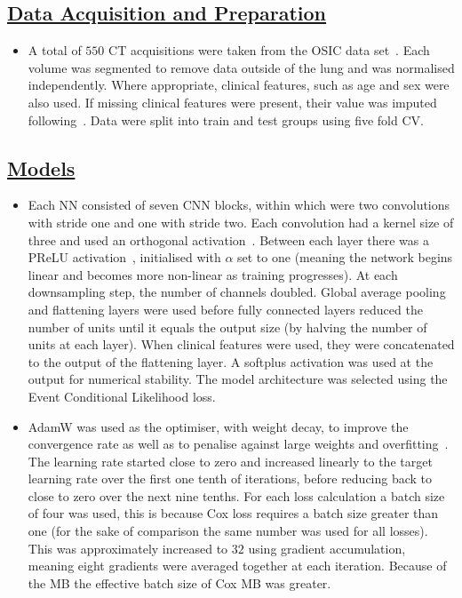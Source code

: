 \documentclass[portrait, color=UCLburgundy, margin=1cm]{uclposter}
\begin{document}
\begin{multicols}{2}
            \subsection*{\underline{\textbf{Data Acquisition and Preparation}}}
                \begin{itemize}
                    \item A total of $550$ \gls{CT} acquisitions were taken from the \gls{OSIC} data set~\cite{OSICOSICRepository}. Each volume was segmented to remove data outside of the lung and was normalised independently. Where appropriate, clinical features, such as age and sex were also used. If missing clinical features were present, their value was imputed following~\cite{Shahin2022SurvivalData}. Data were split into train and test groups using five fold \gls{CV}.
                \end{itemize}

            \subsection*{\underline{\textbf{Models}}}
                \begin{itemize}
                    \item Each \gls{NN} consisted of seven \gls{CNN} blocks, within which were two convolutions with stride one and one with stride two. Each convolution had a kernel size of three and used an orthogonal activation~\cite{Hu2020ProvableNetworks}. Between each layer there was a \gls{PReLU} activation~\cite{He2015DelvingClassification}, initialised with $\alpha$ set to one (meaning the network begins linear and becomes more non-linear as training progresses). At each downsampling step, the number of channels doubled. Global average pooling and flattening layers were used before fully connected layers reduced the number of units until it equals the output size (by halving the number of units at each layer). When clinical features were used, they were concatenated to the output of the flattening layer. A softplus activation was used at the output for numerical stability. The model architecture was selected using the Event Conditional Likelihood loss.
            
                    \item AdamW was used as the optimiser, with weight decay, to improve the convergence rate as well as to penalise against large weights and overfitting~\cite{Loshchilov2019DecoupledRegularization}. The learning rate started close to zero and increased linearly to the target learning rate over the first one tenth of iterations, before reducing back to close to zero over the next nine tenths. For each loss calculation a batch size of four was used, this is because Cox loss requires a batch size greater than one (for the sake of comparison the same number was used for all losses). This was approximately increased to $32$ using gradient accumulation, meaning eight gradients were averaged together at each iteration. Because of the \gls{MB} the effective batch size of Cox \gls{MB} was greater.
            

\end{itemize}
\end{multicols}
\end{document}
